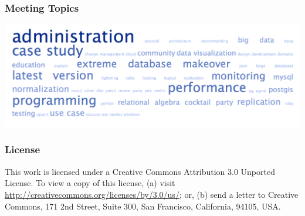 \documentclass{beamer}
\begin{document}
\frame
{
  \frametitle{Meeting Topics}

  \begin{center}
  \includegraphics[width=\textwidth]{tag-cloud.png}
  \end{center}
}


\frame
{
  \frametitle{License}

  This work is licensed under a Creative Commons Attribution 3.0
  Unported License. To view a copy of this license, (a) visit
  \url{http://creativecommons.org/licenses/by/3.0/us/}; or, (b) send a
  letter to Creative Commons, 171 2nd Street, Suite 300, San Francisco,
  California, 94105, USA.
}
\end{document}
